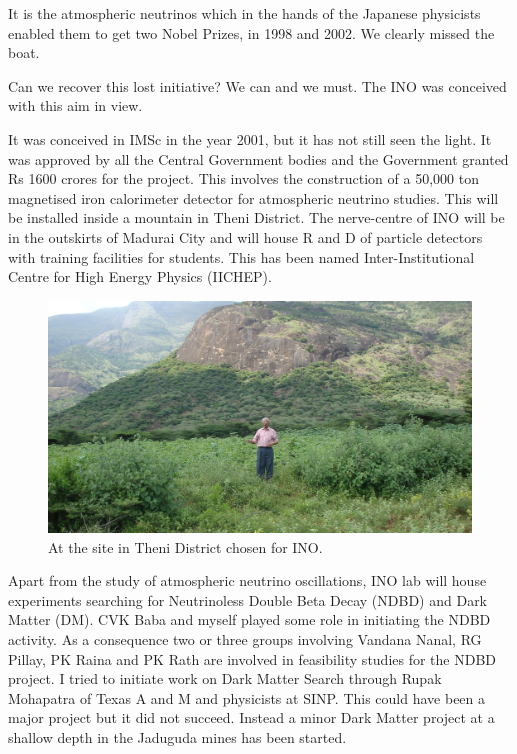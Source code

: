 It is the atmospheric neutrinos which in the hands of the Japanese 
physicists enabled them to get two Nobel Prizes, in 1998 and 2002. We 
clearly missed the boat.

Can we recover this lost initiative? We can and we must. The INO was 
conceived with this aim in view.

It was conceived in IMSc in the year 2001, but it has not still seen the 
light. It was approved by all the Central Government bodies and the 
Government granted Rs 1600 crores for the project. This involves the 
construction of a 50,000 ton magnetised iron calorimeter detector for 
atmospheric neutrino studies. This will be installed inside a mountain 
in Theni District. The nerve-centre of INO will be in the outskirts of 
Madurai City and will house R and D of particle detectors with training 
facilities for students. This has been named Inter-Institutional Centre 
for High Energy Physics (IICHEP).
\begin{figure}[h]
\centering
\includegraphics[width=\textwidth]{images/Rajaji-ino.jpg}
\caption{At the site in Theni District chosen for INO.}  
\end{figure}
Apart from the study of atmospheric neutrino oscillations, INO lab will 
house experiments searching for Neutrinoless Double Beta Decay (NDBD) 
and Dark Matter (DM). CVK Baba and myself played some role in initiating 
the NDBD activity. As a consequence two or three groups involving 
Vandana Nanal, RG Pillay, PK Raina and PK Rath are involved in 
feasibility studies for the NDBD project. I tried to initiate work on 
Dark Matter Search through Rupak Mohapatra of Texas A and M and 
physicists at SINP. This could have been a major project but it did not 
succeed. Instead a minor Dark Matter project at a shallow depth in the 
Jaduguda mines has been started.

